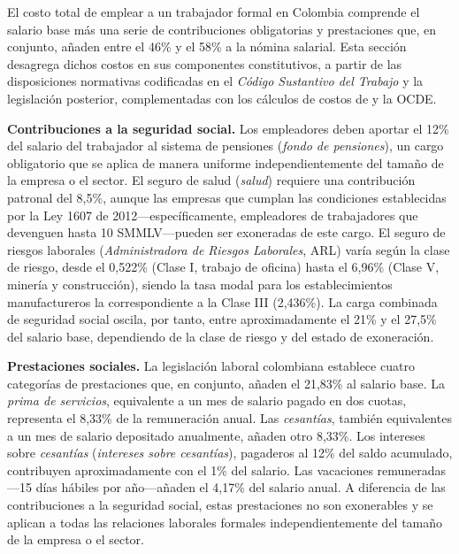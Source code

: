 \documentclass{article}
\begin{document}
El costo total de emplear a un trabajador formal en Colombia comprende el salario base m\'as una serie de contribuciones obligatorias y prestaciones que, en conjunto, a\~naden entre el 46\% y el 58\% a la n\'omina salarial. Esta secci\'on desagrega dichos costos en sus componentes constitutivos, a partir de las disposiciones normativas codificadas en el \textit{C\'odigo Sustantivo del Trabajo} y la legislaci\'on posterior, complementadas con los c\'alculos de costos de \cite{anif2018} y la OCDE.

\textbf{Contribuciones a la seguridad social.} Los empleadores deben aportar el 12\% del salario del trabajador al sistema de pensiones (\textit{fondo de pensiones}), un cargo obligatorio que se aplica de manera uniforme independientemente del tama\~no de la empresa o el sector. El seguro de salud (\textit{salud}) requiere una contribuci\'on patronal del 8,5\%, aunque las empresas que cumplan las condiciones establecidas por la Ley 1607 de 2012---espec\'ificamente, empleadores de trabajadores que devenguen hasta 10 SMMLV---pueden ser exoneradas de este cargo. El seguro de riesgos laborales (\textit{Administradora de Riesgos Laborales}, ARL) var\'ia seg\'un la clase de riesgo, desde el 0,522\% (Clase I, trabajo de oficina) hasta el 6,96\% (Clase V, miner\'ia y construcci\'on), siendo la tasa modal para los establecimientos manufactureros la correspondiente a la Clase III (2,436\%). La carga combinada de seguridad social oscila, por tanto, entre aproximadamente el 21\% y el 27,5\% del salario base, dependiendo de la clase de riesgo y del estado de exoneraci\'on.

\textbf{Prestaciones sociales.} La legislaci\'on laboral colombiana establece cuatro categor\'ias de prestaciones que, en conjunto, a\~naden el 21,83\% al salario base. La \textit{prima de servicios}, equivalente a un mes de salario pagado en dos cuotas, representa el 8,33\% de la remuneraci\'on anual. Las \textit{cesant\'ias}, tambi\'en equivalentes a un mes de salario depositado anualmente, a\~naden otro 8,33\%. Los intereses sobre \textit{cesant\'ias} (\textit{intereses sobre cesant\'ias}), pagaderos al 12\% del saldo acumulado, contribuyen aproximadamente con el 1\% del salario. Las vacaciones remuneradas---15 d\'ias h\'abiles por a\~no---a\~naden el 4,17\% del salario anual. A diferencia de las contribuciones a la seguridad social, estas prestaciones no son exonerables y se aplican a todas las relaciones laborales formales independientemente del tama\~no de la empresa o el sector.
\end{document}
